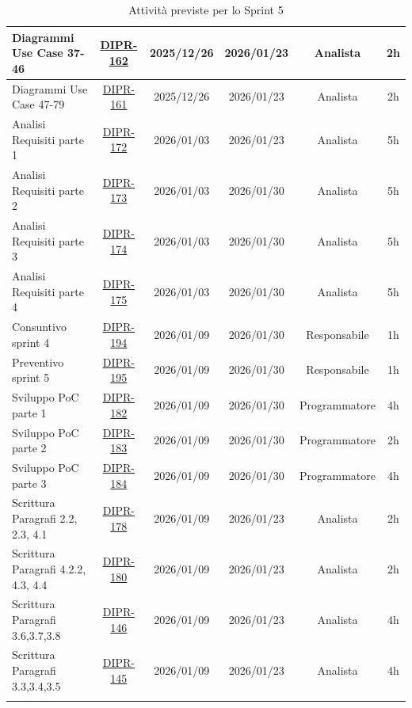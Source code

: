 \documentclass[a4paper,12pt]{article}
\begin{document}
\begin{longtable}{|p{4cm}|c|c|c|c|c|}
    \hline
    Diagrammi Use Case 37-46 & \href{https://7zpus.atlassian.net/browse/DIPR-162}{DIPR-162} & 2025/12/26 & 2026/01/23 & Analista & 2h \\
    \hline
    Diagrammi Use Case 47-79 & \href{https://7zpus.atlassian.net/browse/DIPR-161}{DIPR-161} & 2025/12/26 & 2026/01/23 & Analista & 2h \\
    \hline
    Analisi Requisiti parte 1 & \href{https://7zpus.atlassian.net/browse/DIPR-172}{DIPR-172} & 2026/01/03 & 2026/01/23 & Analista & 5h \\
    \hline
    Analisi Requisiti parte 2 & \href{https://7zpus.atlassian.net/browse/DIPR-173}{DIPR-173} & 2026/01/03 & 2026/01/30 & Analista & 5h \\
    \hline
    Analisi Requisiti parte 3 & \href{https://7zpus.atlassian.net/browse/DIPR-174}{DIPR-174} & 2026/01/03 & 2026/01/30 & Analista & 5h \\
    \hline
    Analisi Requisiti parte 4 & \href{https://7zpus.atlassian.net/browse/DIPR-175}{DIPR-175} & 2026/01/03 & 2026/01/30 & Analista & 5h \\
    \hline
    Consuntivo sprint 4 & \href{https://7zpus.atlassian.net/browse/DIPR-194}{DIPR-194} & 2026/01/09 & 2026/01/30 & Responsabile & 1h \\
    \hline
    Preventivo sprint 5 & \href{https://7zpus.atlassian.net/browse/DIPR-195}{DIPR-195} & 2026/01/09 & 2026/01/30 & Responsabile & 1h \\
    \hline
    Sviluppo PoC parte 1 & \href{https://7zpus.atlassian.net/browse/DIPR-182}{DIPR-182} & 2026/01/09 & 2026/01/30 & Programmatore & 4h \\
    \hline
    Sviluppo PoC parte 2 & \href{https://7zpus.atlassian.net/browse/DIPR-183}{DIPR-183} & 2026/01/09 & 2026/01/30 & Programmatore & 2h \\
    \hline
    Sviluppo PoC parte 3 & \href{https://7zpus.atlassian.net/browse/DIPR-184}{DIPR-184} & 2026/01/09 & 2026/01/30 & Programmatore & 4h \\
    \hline
    Scrittura Paragrafi 2.2, 2.3, 4.1 & \href{https://7zpus.atlassian.net/browse/DIPR-178}{DIPR-178} & 2026/01/09 & 2026/01/23 & Analista & 2h \\
    \hline
    Scrittura Paragrafi 4.2.2, 4.3, 4.4 & \href{https://7zpus.atlassian.net/browse/DIPR-180}{DIPR-180} & 2026/01/09 & 2026/01/23 & Analista & 2h \\
    \hline
    Scrittura Paragrafi 3.6,3.7,3.8& \href{https://7zpus.atlassian.net/browse/DIPR-146}{DIPR-146} & 2026/01/09 & 2026/01/23 & Analista & 4h \\
    \hline
    Scrittura Paragrafi 3.3,3.4,3.5 & \href{https://7zpus.atlassian.net/browse/DIPR-145}{DIPR-145} & 2026/01/09 & 2026/01/23 & Analista & 4h \\
    \hline
    \rowcolor{white}
    \caption{Attività previste per lo Sprint 5}

\end{longtable}
\end{document}
